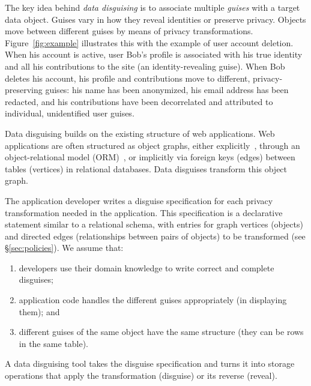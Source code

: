 %
The key idea behind \emph{data disguising} is to associate multiple \emph{guises} with a target
data object. Guises vary in how they reveal identities or preserve privacy.
%
Objects move between different guises by means of privacy transformations.
%
Figure~\ref{fig:example} illustrates this with the example of user account deletion.
%
When his account is active, user Bob's profile is associated with his true identity and all his
contributions to the site (an identity-revealing guise).
%
When Bob deletes his account, his profile and contributions move to different, privacy-preserving
guises: his name has been anonymized, his email address has been redacted, and his contributions
have been decorrelated and attributed to individual, unidentified user guises.
%

%
Data disguising builds on the existing structure of web applications.
%
Web applications are often structured as object graphs, either explicitly~\cite{tao, delf},
through an object-relational model (ORM)~\cite{orm}, or implicitly via foreign keys (edges)
between tables (vertices) in relational databases.
%
Data disguises transform this object graph.
%

%
The application developer writes a disguise specification for each privacy transformation needed
in the application.
%
This specification is a declarative statement similar to a relational schema, with entries for
graph vertices (objects) and directed edges (relationships between pairs of objects)
to be transformed (see \S\ref{sec:policies}).
%
We assume that:
\begin{enumerate}[nosep]
  \item developers use their domain knowledge to write correct and complete disguises;
  \item application code handles the different guises appropriately (\eg in
    displaying them); and
  \item different guises of the same object have the same structure (\eg they can be
    rows in the same table).
\end{enumerate}
%
A data disguising tool takes the disguise specification and turns it into storage operations that
apply the transformation (disguise) or its reverse (reveal).
%
%

